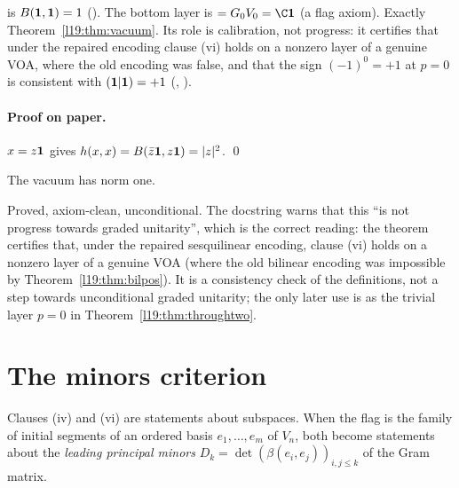 \begin{dictionary}
 is $B(\mathbf{1},\mathbf{1}) = 1$ ().
The bottom layer is  $= \lnineteenG_0V_0 = \C\lnineteenvac$ (a flag axiom). Exactly
Theorem~\ref{l19:thm:vacuum}. Its role is calibration, not progress: it certifies that under the
repaired encoding clause (vi) holds on a nonzero layer of a genuine VOA, where the old encoding was
false, and that the sign $(-1)^0 = +1$ at $p=0$ is consistent with $(\mathbf{1}|\mathbf{1}) = +1$
(\allowbreak{}\allowbreak{}, ).
\end{dictionary}

\paragraph{Proof on paper.} $x = z\mathbf{1}$ gives $h(x,x) = B(\bar z\mathbf{1},z\mathbf{1}) =
|z|^2$. \qed

\begin{physics}
The vacuum has norm one.
\end{physics}

\begin{status}
Proved, axiom-clean, unconditional. The docstring warns that this ``is not progress towards graded
unitarity'', which is the correct reading: the theorem certifies that, under the repaired sesquilinear
encoding, clause (vi) holds on a nonzero layer of a genuine VOA (where the old bilinear encoding was
impossible by Theorem~\ref{l19:thm:bilpos}). It is a consistency check of the definitions, not a step towards
unconditional graded unitarity; the only later use is as the trivial layer $p = 0$ in
Theorem~\ref{l19:thm:throughtwo}.
\end{status}

\section{The minors criterion}\label{l19:sec:minors}

Clauses (iv) and (vi) are statements about subspaces. When the flag is the family of initial
segments of an ordered basis $e_1,\dots,e_m$ of $V_n$, both become statements about the
\emph{leading principal minors} $D_k = \det(\beta(e_i,e_j))_{i,j\le k}$ of the Gram matrix.


